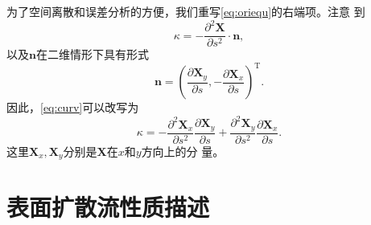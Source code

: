 \documentclass[a4paper,twoside]{ctexart}
\newcommand{\pdfrac}[2]{\frac{\partial #1}{\partial #2}}
\begin{document}
为了空间离散和误差分析的方便，我们重写\eqref{eq:oriequ}的右端项。注意
到
\begin{equation}
  \kappa = -\frac{\partial^2\boldsymbol X}{\partial s^2}\cdot \boldsymbol n,
  \label{eq:curv}
\end{equation}
以及$\boldsymbol n$在二维情形下具有形式
\begin{equation}
  \label{eq:onor}
  \boldsymbol n = (\pdfrac{\boldsymbol X_y}{s},-\pdfrac{\boldsymbol X_x}{s})^{\text{T}}.
\end{equation}
因此，\eqref{eq:curv}可以改写为
\begin{equation}
  \label{eq:rcurv}
  \kappa = -\frac{\partial^2\boldsymbol X_x}{\partial
    s^2}\pdfrac{\boldsymbol X_y}{s} + \frac{\partial^2\boldsymbol X_y}{\partial
    s^2}\pdfrac{\boldsymbol X_x}{s}.
\end{equation}
这里$\boldsymbol X_x,\boldsymbol X_y$分别是$\boldsymbol X$在$x$和$y$方向上的分
量。
\section{表面扩散流性质描述}
\end{document}
